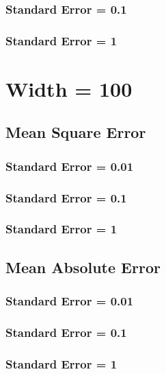 \documentclass[12pt]{article}
\theoremstyle{remark}
\begin{document}
			\subsubsection{Standard Error = 0.1}
			\subsubsection{Standard Error = 1}
	
	\section{Width = 100}
		\subsection{Mean Square Error}
			\subsubsection{Standard Error = 0.01}
			\subsubsection{Standard Error = 0.1}
			\subsubsection{Standard Error = 1}
		\subsection{Mean Absolute Error}
			\subsubsection{Standard Error = 0.01}
			\subsubsection{Standard Error = 0.1}
			\subsubsection{Standard Error = 1}
	


	
	\printbibliography
	
	\newpage

\end{document}
